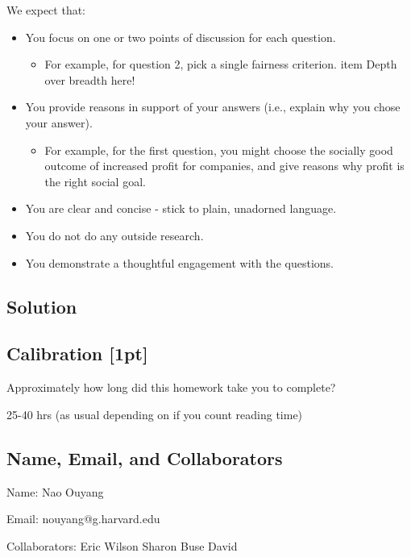 \documentclass[submit]{harvardml}
\newenvironment{answer}{%
    \color{answergreen}\bf}
  {%
  }
\begin{document}
\begin{problem}
We expect that:
\begin{itemize}
\item You focus on one or two points of discussion for each question. 
\begin{itemize}
\item For example, for question 2, pick a single fairness criterion. 
item Depth over breadth here! 
\end{itemize}
\item You provide reasons in support of your answers (i.e., explain why you chose your answer).
\begin{itemize}
\item For example, for the first question, you might choose the socially good outcome of increased profit for companies, and give reasons why profit is the right social goal.
\end{itemize}
\item You are clear and concise - stick to plain, unadorned language.  
\item You do not do any outside research. 
\item You demonstrate a thoughtful engagement with the questions. 
\end{itemize}


\end{problem}

\subsection*{Solution}
    \begin{answer}

    \end{answer}
\newpage


\subsection*{Calibration [1pt]}
Approximately how long did this homework take you to complete?

25-40 hrs (as usual depending on if you count reading time)

\subsection*{Name, Email, and Collaborators}

Name: Nao Ouyang

Email: nouyang@g.harvard.edu    

Collaborators:
Eric
Wilson
Sharon
Buse
David
\end{document}
